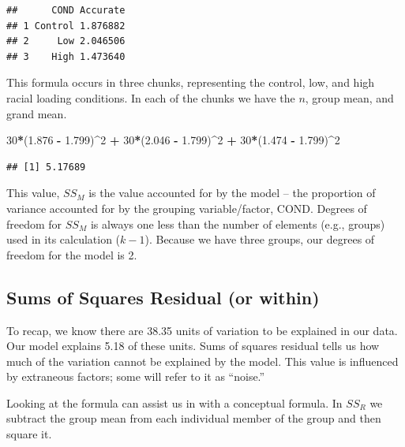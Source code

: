 \documentclass[
  english,
]{book}
\newenvironment{Shaded}{\begin{snugshade}}{\end{snugshade}}
\newcommand{\DecValTok}[1]{\textcolor[rgb]{0.00,0.00,0.81}{#1}}
\newcommand{\FloatTok}[1]{\textcolor[rgb]{0.00,0.00,0.81}{#1}}
\newcommand{\NormalTok}[1]{#1}
\newcommand{\OperatorTok}[1]{\textcolor[rgb]{0.81,0.36,0.00}{\textbf{#1}}}
\newcommand{\StringTok}[1]{\textcolor[rgb]{0.31,0.60,0.02}{#1}}
\begin{document}
\begin{verbatim}
##      COND Accurate
## 1 Control 1.876882
## 2     Low 2.046506
## 3    High 1.473640
\end{verbatim}

This formula occurs in three chunks, representing the control, low, and high racial loading conditions. In each of the chunks we have the \(n\), group mean, and grand mean.

\begin{Shaded}
\begin{Highlighting}[]
\DecValTok{30}\OperatorTok{*}\NormalTok{(}\FloatTok{1.876} \OperatorTok{-}\StringTok{ }\FloatTok{1.799}\NormalTok{)}\OperatorTok{^}\DecValTok{2} \OperatorTok{+}\StringTok{ }\DecValTok{30}\OperatorTok{*}\NormalTok{(}\FloatTok{2.046} \OperatorTok{-}\StringTok{ }\FloatTok{1.799}\NormalTok{)}\OperatorTok{^}\DecValTok{2} \OperatorTok{+}\StringTok{ }\DecValTok{30}\OperatorTok{*}\NormalTok{(}\FloatTok{1.474} \OperatorTok{-}\StringTok{ }\FloatTok{1.799}\NormalTok{)}\OperatorTok{^}\DecValTok{2}
\end{Highlighting}
\end{Shaded}

\begin{verbatim}
## [1] 5.17689
\end{verbatim}

This value, \(SS_M\) is the value accounted for by the model -- the proportion of variance accounted for by the grouping variable/factor, COND. Degrees of freedom for \(SS_M\) is always one less than the number of elements (e.g., groups) used in its calculation (\(k-1\)). Because we have three groups, our degrees of freedom for the model is 2.

\hypertarget{sums-of-squares-residual-or-within}{%
\subsection{Sums of Squares Residual (or within)}\label{sums-of-squares-residual-or-within}}

To recap, we know there are 38.35 units of variation to be explained in our data. Our model explains 5.18 of these units. Sums of squares residual tells us how much of the variation cannot be explained by the model. This value is influenced by extraneous factors; some will refer to it as ``noise.''

Looking at the formula can assist us in with a conceptual formula. In \(SS_R\) we subtract the group mean from each individual member of the group and then square it.
\end{document}
